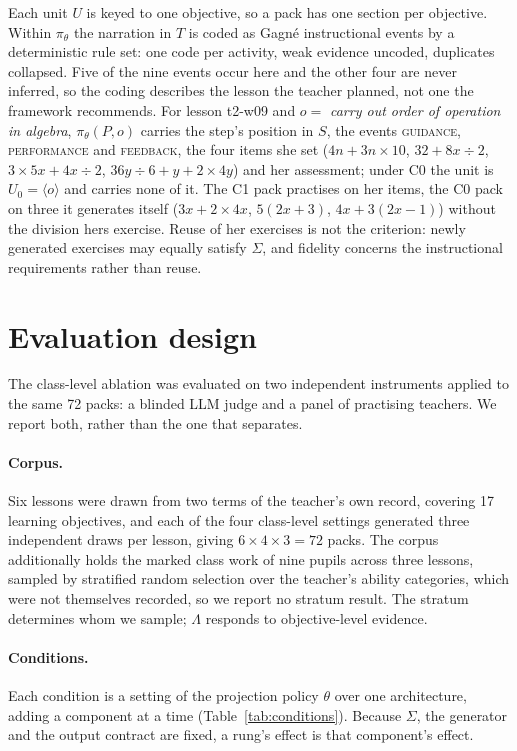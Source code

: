 \documentclass{article}
\begin{document}
Each unit $U$ is keyed to one objective, so a pack has one section per objective. Within
$\pi_\theta$ the narration in $T$ is coded as Gagn\'e instructional events \citep{gagne1985} by
a deterministic rule set: one code per activity, weak evidence uncoded, duplicates collapsed.
Five of the nine events occur here and the other four are never inferred, so the coding
describes the lesson the teacher planned, not one the framework recommends. For lesson t2-w09 and $o=$ \emph{carry out order of operation in algebra},
$\pi_\theta(P,o)$ carries the step's position in $S$, the events \textsc{guidance},
\textsc{performance} and \textsc{feedback}, the four items she set ($4n+3n\times10$,
$32+8x\div2$, $3\times5x+4x\div2$, $36y\div6+y+2\times4y$) and her assessment; under C0 the
unit is $U_0=\langle o\rangle$ and carries none of it. The C1 pack practises on her items, the
C0 pack on three it generates itself ($3x+2\times4x$, $5(2x+3)$, $4x+3(2x-1)$) without the
division hers exercise. Reuse of her exercises is not the criterion: newly generated
exercises may equally satisfy $\Sigma$, and fidelity concerns the instructional requirements
rather than reuse.




\section{Evaluation design}
\label{sec:design}

The class-level ablation was evaluated on two independent instruments applied to the same 72
packs: a blinded LLM judge and a panel of practising teachers. We report both, rather than
the one that separates.

\paragraph{Corpus.}
Six lessons were drawn from two terms of the teacher's own record, covering 17 learning
objectives, and each of the four class-level settings generated three independent draws per
lesson, giving $6\times4\times3=72$ packs. The corpus additionally holds the marked class work
of nine pupils across three lessons, sampled by stratified random selection over the teacher's
ability categories, which were not themselves recorded, so we report no stratum result. The
stratum determines whom we sample; $\Lambda$ responds to objective-level evidence.

\paragraph{Conditions.}
Each condition is a setting of the projection policy $\theta$ over one architecture, adding a
component at a time (Table~\ref{tab:conditions}). Because $\Sigma$, the generator and the
output contract are fixed, a rung's effect is that component's effect.
\end{document}
